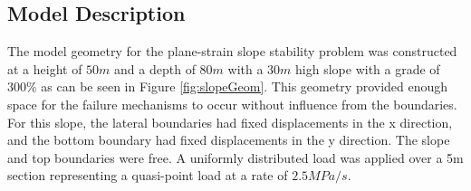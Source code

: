 \subsection{Model Description}

The model geometry for the plane-strain slope stability problem was constructed at a height of $50m$ and a depth of $80m$ with a $30m$ high slope with a grade of $300\%$ as can be seen in Figure \ref{fig:slopeGeom}. This geometry provided enough space for the failure mechanisms to occur without influence from the boundaries. For this slope, the lateral boundaries had fixed displacements in the x direction, and the bottom boundary had fixed displacements in the y direction. The slope and top boundaries were free. A uniformly distributed load was applied over a 5m section representing a quasi-point load at a rate of $2.5 MPa/s$. 
